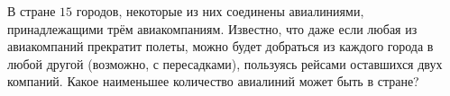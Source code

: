 В стране $15$ городов, некоторые из них соединены авиалиниями, принадлежащими трём авиакомпаниям. Известно, что даже если любая из авиакомпаний прекратит полеты, можно будет добраться из каждого города в любой другой (возможно, с пересадками), пользуясь рейсами оставшихся двух компаний. Какое наименьшее количество авиалиний может быть в стране?